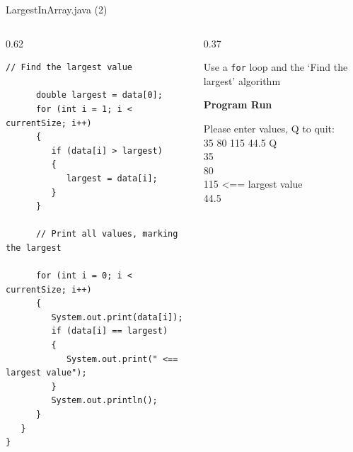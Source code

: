 \documentclass[aspectratio=43,10pt,t]{beamer}
\newcommand{\programrun}[2]{%
  \begin{minipage}{#1}
    {\bfseries\small\color{lineno} Program Run}\par\vskip1mm
    {\setlength{\fboxsep}{4pt}\colorbox{progbg}{%
      \parbox{\dimexpr\linewidth-8pt\relax}{\ttfamily\fontsize{6}{7.4}\selectfont #2}}}
  \end{minipage}}
\newcommand{\userinput}[1]{\textcolor{lineno}{#1}}
\newcommand{\code}[1]{\texttt{#1}}
\newcommand{\callout}[2][\linewidth]{%
  {\setlength{\fboxsep}{3pt}\colorbox{callout}{%
    \parbox{\dimexpr#1-6pt\relax}{\raggedright\footnotesize #2}}}}
\begin{document}
\begin{frame}[fragile]{LargestInArray.java (2)}
  \begin{columns}[T]
    \begin{column}{0.62\textwidth}
\begin{lstlisting}[style=program,firstnumber=24,basicstyle=\ttfamily\fontsize{5.9}{7}\selectfont]
      // Find the largest value

      double largest = data[0];
      for (int i = 1; i < currentSize; i++)
      {
         if (data[i] > largest)
         {
            largest = data[i];
         }
      }

      // Print all values, marking the largest

      for (int i = 0; i < currentSize; i++)
      {
         System.out.print(data[i]);
         if (data[i] == largest)
         {
            System.out.print(" <== largest value");
         }
         System.out.println();
      }
   }
}
\end{lstlisting}
    \end{column}
    \begin{column}{0.37\textwidth}
      \vskip4mm
      \callout{Use a \code{for} loop and the `Find the largest' algorithm}
      \vskip8mm
      \programrun{\linewidth}{%
        \fontsize{5.7}{7}\selectfont
        Please enter values, Q to quit:\\
        \userinput{35 80 115 44.5 Q}\\
        35\\
        80\\
        115 <== largest value\\
        44.5}
    \end{column}
  \end{columns}
\end{frame}
\end{document}
